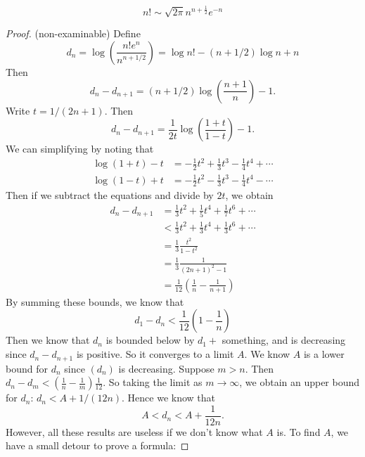 %
\begin{note}
  \begin{field}
    \begin{cor}
      \[
        n!\sim \sqrt{2\pi}n^{n + \frac{1}{2}} e^{-n}
      \]
    \end{cor}
  \end{field}
  \begin{field}
    \begin{proof}(non-examinable)
      Define
      \[
        d_n = \log \left(\frac{n!e^n}{n^{n + 1/2}}\right) = \log n! - (n + 1/2)\log n + n
      \]
      Then
      \[
        d_n - d_{n + 1} = (n + 1/2)\log\left(\frac{n + 1}{n}\right) - 1.
      \]
      Write $t = 1/(2n + 1)$. Then
      \[
        d_n - d_{n + 1} = \frac{1}{2t}\log\left(\frac{1 + t}{1 - t}\right) - 1.
      \]
      We can simplifying by noting that
      \begin{align*}
        \log (1 + t) - t &= -\frac{1}{2}t^2 + \frac{1}{3}t^3 - \frac{1}{4}t^4 + \cdots\\
        \log (1 - t) + t &= -\frac{1}{2}t^2 - \frac{1}{3}t^3 - \frac{1}{4}t^4 - \cdots
      \end{align*}
      Then if we subtract the equations and divide by $2t$, we obtain
      \begin{align*}
        d_n - d_{n + 1} &= \frac{1}{3}t^2 + \frac{1}{5}t^4 + \frac{1}{7}t^6 + \cdots\\
        &< \frac{1}{3}t^2 + \frac{1}{3}t^4 + \frac{1}{3}t^6 + \cdots\\
        &= \frac{1}{3}\frac{t^2}{1 - t^2}\\
        &= \frac{1}{3}\frac{1}{(2n + 1)^2 - 1}\\
        &= \frac{1}{12}\left(\frac{1}{n} - \frac{1}{n + 1}\right)
      \end{align*}
      By summing these bounds, we know that
      \[
        d_1 - d_n < \frac{1}{12}\left(1 - \frac{1}{n}\right)
      \]
      Then we know that $d_n$ is bounded below by $d_1 +$ something, and is decreasing since $d_n - d_{n + 1}$ is positive. So it converges to a limit $A$. We know $A$ is a lower bound for $d_n$ since $(d_n)$ is decreasing.
      Suppose $m > n$. Then $d_n - d_m < \left(\frac{1}{n} - \frac{1}{m}\right)\frac{1}{12}$. So taking the limit as $m\to \infty$, we obtain an upper bound for $d_n$: $d_n < A + 1/(12n)$. Hence we know that
      \[
        A < d_n < A + \frac{1}{12n}.
      \]
      However, all these results are useless if we don't know what $A$ is. To find $A$, we have a small detour to prove a formula:

\end{proof}
\end{field}
\end{note}
